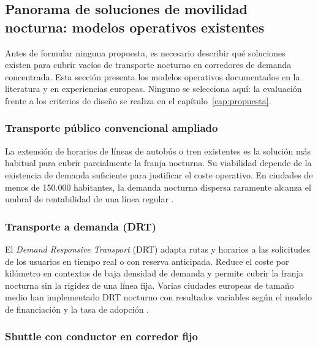 
\subsection{Panorama de soluciones de movilidad nocturna: modelos operativos existentes}
\label{sec:panorama-soluciones}

Antes de formular ninguna propuesta, es necesario describir
qué soluciones existen para cubrir vacíos de transporte
nocturno en corredores de demanda concentrada. Esta sección
presenta los modelos operativos documentados en la
literatura y en experiencias europeas. Ninguno se selecciona
aquí: la evaluación frente a los criterios de diseño
se realiza en el capítulo~\ref{cap:propuesta}.

\subsubsection{Transporte público convencional ampliado}
\label{sec:sol-tp-convencional}

La extensión de horarios de líneas de autobús o tren
existentes es la solución más habitual para cubrir
parcialmente la franja nocturna. Su viabilidad depende
de la existencia de demanda suficiente para justificar
el coste operativo. En ciudades de menos de 150.000
habitantes, la demanda nocturna dispersa raramente
alcanza el umbral de rentabilidad de una línea regular
\parencite{Estrada2021}.

\subsubsection{Transporte a demanda (DRT)}
\label{sec:sol-drt}

El \emph{Demand Responsive Transport} (DRT) adapta rutas
y horarios a las solicitudes de los usuarios en tiempo
real o con reserva anticipada. Reduce el coste por
kilómetro en contextos de baja densidad de demanda y
permite cubrir la franja nocturna sin la rigidez de
una línea fija. Varias ciudades europeas de tamaño medio
han implementado DRT nocturno con resultados variables
según el modelo de financiación y la tasa de adopción
\parencite{Busitalia2019QuiBus, K2Centrum2025DRT}.

\subsubsection{Shuttle con conductor en corredor fijo}
\label{sec:sol-shuttle-conductor}

